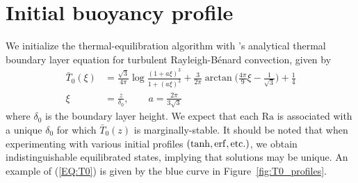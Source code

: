 \documentclass[reprint,amsmath,amssymb,aps]{revtex4-1}
\newcommand\Ra{\mathrm{Ra}}
\newcommand{\eq}[1]{(\ref{#1})}
\begin{document}
\section{Initial buoyancy profile} \label{sec:initial_profile}
We initialize the thermal-equilibration algorithm with \cite{Shishkina}'s analytical thermal boundary layer equation for turbulent Rayleigh-B\'enard convection, given by 
\begin{align}
    \bar{T}_0(\xi) &= \frac{\sqrt{3}}{4\pi} \log \frac{(1 + a\xi)^3}{1 + (a\xi)^3} + \frac{3}{2\pi} \arctan \Big( \frac{4\pi}{9}\xi - \frac{1}{\sqrt{3}} \Big) + \frac{1}{4} \nonumber \\
    \xi &= \frac{z}{\delta_0}, \qquad a = \frac{2\pi}{3\sqrt{3}}\label{EQ:T0}
\end{align}
where $\delta_0$ is the boundary layer height. 
We expect that each $\Ra$ is associated with a unique $\delta_0$ for which $\bar{T}_0(z)$ is marginally-stable. 
It should be noted that when experimenting with various initial profiles $(\tanh, \rm{erf}, \rm{etc.})$, we obtain indistinguishable equilibrated states, implying that solutions may be unique. 
An example of \eq{EQ:T0} is given by the blue curve in Figure~\ref{fig:T0_profiles}.

\end{document}
